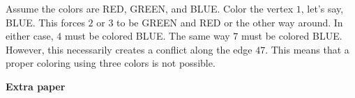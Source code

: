 \documentclass[12pt]{article}
\begin{document}
\begin{enumerate}
\begin{enumerate}
Assume the colors are RED, GREEN, and BLUE. Color the vertex $1$, let's say, BLUE. This forces $2$ or $3$ to be GREEN and RED or the other way around. In either case, $4$ must be colored BLUE. The same way $7$ must be colored BLUE. However, this necessarily creates a conflict along the edge $47$. This means that a proper coloring using three colors is not possible.

\end{enumerate}


\end{enumerate}

\newpage
\noindent
\textbf{Extra paper}
%

%
\end{document}
